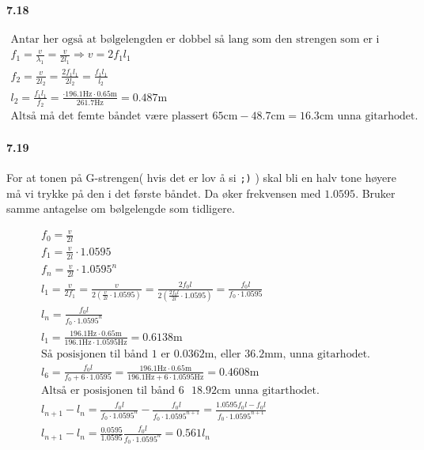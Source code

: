 \documentclass[11pt, A4paper,norsk]{article}
\begin{document}
		\paragraph{7.18}
			\begin{gather*}
\text{Antar her også at bølgelengden er dobbel så lang som den strengen som er i bruk} \\
f_1 = \frac{v}{\lambda_1} = \frac{v}{2 l_1} \Rightarrow v = 2f_1l_1 \\
f_2 = \frac{v}{2 l_2} = \frac{2 f_1 l_1}{2 l_2} = \frac{f_1 l_1}{l_2} \\
l_2 = \frac{f_1 l_1}{f_2} = \frac{\cdot 196.1\text{Hz} \cdot 0.65\text{m}}{261.7\text{Hz}} = 0.487\text{m} \\
\text{Altså må det femte båndet være plassert $65\text{cm} - 48.7\text{cm} = 16.3\text{cm}$ unna gitarhodet.}
			\end{gather*}










		\paragraph{7.19}
			\begin{flushleft}
For at tonen på G-strengen( hvis det er lov å si {\tt;)} ) skal bli en halv tone høyere må vi trykke på den i det første båndet. Da øker frekvensen med $1.0595$. Bruker samme antagelse om bølgelengde som tidligere.
			\end{flushleft}
			\begin{gather*}
f_0 = \frac{v}{2l} \\
f_1 = \frac{v}{2l} \cdot 1.0595 \\
f_n = \frac{v}{2l} \cdot 1.0595^n \\
l_1 = \frac{v}{2f_1} = \frac{v}{2 \left( \frac{v}{2l} \cdot 1.0595 \right)} = \frac{2 f_0 l}{2 \left( \frac{2 f_0 l}{2l} \cdot 1.0595 \right)} = \frac{f_0l}{f_0 \cdot 1.0595} \\
l_n = \frac{f_0 l}{f_0 \cdot 1.0595^n} \\
l_1 = \frac{196.1\text{Hz} \cdot 0.65\text{m}}{196.1\text{Hz} \cdot 1.0595\text{Hz}} = 0.6138\text{m} \\
\text{Så posisjonen til bånd $1$ er $0.0362\text{m}$, eller $36.2\text{mm}$, unna gitarhodet.} \\
l_6 = \frac{f_0 l}{f_0 + 6 \cdot 1.0595} = \frac{196.1\text{Hz} \cdot 0.65\text{m}}{196.1\text{Hz} + 6 \cdot 1.0595\text{Hz}} = 0.4608\text{m} \\
\text{Altså er posisjonen til bånd $6$ $18.92\text{cm}$ unna gitarthodet.} \\
l_{n + 1} - l_{n} = \frac{f_0 l}{f_0 \cdot 1.0595^n} - \frac{f_0 l}{f_0 \cdot 1.0595^{n + 1}} = \frac{1.0595 f_0 l - f_0 l}{f_0 \cdot 1.0595^{n + 1}} \\
l_{n + 1} - l_n = \frac{0.0595}{1.0595} \frac{f_0 l}{f_0 \cdot 1.0595^n} = 0.561 l_n
			\end{gather*}
\end{document}
